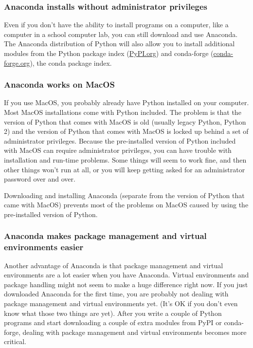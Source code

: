 \documentclass{book}
\begin{document}
\subsubsection{Anaconda installs without administrator
privileges}\label{anaconda-installs-without-administrator-privileges}

Even if you don't have the ability to install programs on a computer,
like a computer in a school computer lab, you can still download and use
Anaconda. The Anaconda distribution of Python will also allow you to
install additional modules from the Python package index
(\href{https://pypi.org/}{PyPI.org}) and conda-forge
(\href{https://conda-forge.org/}{conda-forge.org}), the conda package
index.

\subsubsection{Anaconda works on MacOS}\label{anaconda-works-on-macos}

If you use MacOS, you probably already have Python installed on your
computer. Most MacOS installations come with Python included. The
problem is that the version of Python that comes with MacOS is old
(usually legacy Python, Python 2) and the version of Python that comes
with MacOS is locked up behind a set of administrator privileges.
Because the pre-installed version of Python included with MacOS can
require administrator privileges, you can have trouble with installation
and run-time problems. Some things will seem to work fine, and then
other things won't run at all, or you will keep getting asked for an
administrator password over and over.

Downloading and installing Anaconda (separate from the version of Python
that came with MacOS) prevents most of the problems on MacOS caused by
using the pre-installed version of Python.

\subsubsection{Anaconda makes package management and virtual
environments
easier}\label{anaconda-makes-package-management-and-virtual-environments-easier}

Another advantage of Anaconda is that package management and virtual
environments are a lot easier when you have Anaconda. Virtual
environments and package handling might not seem to make a huge
difference right now. If you just downloaded Anaconda for the first
time, you are probably not dealing with package management and virtual
environments yet. (It's OK if you don't even know what those two things
are yet). After you write a couple of Python programs and start
downloading a couple of extra modules from PyPI or conda-forge, dealing
with package management and virtual environments becomes more critical.
    
\end{document}
